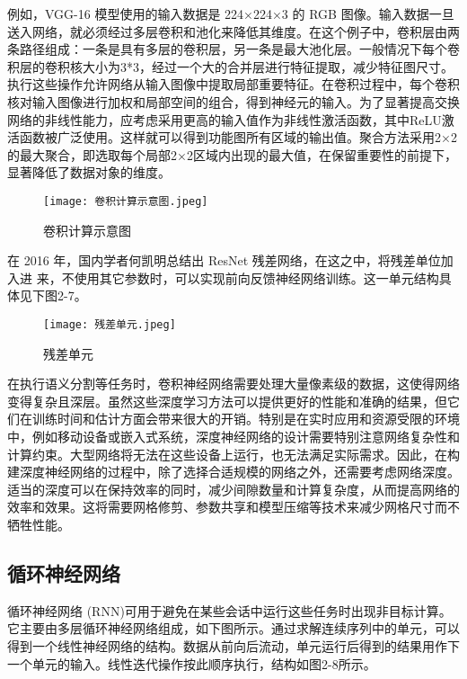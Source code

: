 例如，VGG-16 模型\cite{simonyan2014very}使用的输入数据是 224×224×3 的 RGB 图像。输入数据一旦送入网络，就必须经过多层卷积和池化来降低其维度。在这个例子中，卷积层由两条路径组成：一条是具有多层的卷积层，另一条是最大池化层。一般情况下每个卷积层的卷积核大小为3*3，经过一个大的合并层进行特征提取，减少特征图尺寸。执行这些操作允许网络从输入图像中提取局部重要特征。在卷积过程中，每个卷积核对输入图像进行加权和局部空间的组合，得到神经元的输入。为了显著提高交换网络的非线性能力，应考虑采用更高的输入值作为非线性激活函数，其中ReLU激活函数被广泛使用。这样就可以得到功能图所有区域的输出值。聚合方法采用2×2的最大聚合，即选取每个局部2×2区域内出现的最大值，在保留重要性的前提下，显著降低了数据对象的维度。

\begin{figure}[hbt]
	\centering
	\texttt{[image: 卷积计算示意图.jpeg]}
	\caption{卷积计算示意图}
	\label{f.example}
\end{figure}

在 2016 年，国内学者何凯明总结出 ResNet 残差网络\cite{he2016deep}，在这之中，将残差单位加入进
来，不使用其它参数时，可以实现前向反馈神经网络训练。这一单元结构具体见下图2-7。

\begin{figure}[hbt]
	\centering
	\texttt{[image: 残差单元.jpeg]}
	\caption{残差单元}
	\label{f.example}
\end{figure}

在执行语义分割等任务时，卷积神经网络需要处理大量像素级的数据，这使得网络变得复杂且深层。虽然这些深度学习方法可以提供更好的性能和准确的结果，但它们在训练时间和估计方面会带来很大的开销。特别是在实时应用和资源受限的环境中，例如移动设备或嵌入式系统，深度神经网络的设计需要特别注意网络复杂性和计算约束。大型网络将无法在这些设备上运行，也无法满足实际需求。因此，在构建深度神经网络的过程中，除了选择合适规模的网络之外，还需要考虑网络深度。适当的深度可以在保持效率的同时，减少间隙数量和计算复杂度，从而提高网络的效率和效果。这将需要网格修剪、参数共享和模型压缩等技术来减少网格尺寸而不牺牲性能。

\subsection{循环神经网络}

循环神经网络 (RNN)\cite{zaremba2014recurrent}可用于避免在某些会话中运行这些任务时出现非目标计算。它主要由多层循环神经网络组成，如下图所示。通过求解连续序列中的单元，可以得到一个线性神经网络的结构。数据从前向后流动，单元运行后得到的结果用作下一个单元的输入。线性迭代操作按此顺序执行，结构如图2-8所示。

